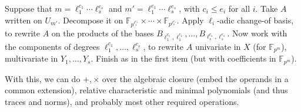 \documentclass{sig-alternate}
\def\F {\ensuremath{\mathbb{F}}}
\begin{document}
\begin{itemize}
  Suppose that $m = \ell_1^{c_1} \cdots \ell_s^{c_s}$ and $m' =
  \ell_1^{e_1} \cdots \ell_s^{e_s}$, with $c_i \le e_i$ for all $i$.
  Take $A$ written on $U_{m'}$. Decompose it on $\F_{p^{\ell_1^{e_1}}}
  \times \cdots \times \F_{p^{\ell_s^{e_s}}}$. Apply $\ell_i$-adic
  change-of basis, to rewrite $A$ on the products of the bases
  $B_{\ell_1^{c_1},\ell_1^{e_1}},\dots,B_{\ell_s^{c_s},\ell_s^{e_s}}$.
  Now work with the components of degrees $\ell_1^{c_1},\dots,\ell_s^{c_s}$,
  to rewrite $A$ univariate in $X$ (for $\F_{p^m}$), multivariate 
  in $Y_1,\dots,Y_s$. Finish as in the first item (but with coefficients in
  $\F_{p^m}$).
\end{itemize}

With this, we can do $+,\times$ over the algebraic closure (embed the
operands in a common extension), relative characteristic and minimal
polynomials (and thus traces and norms), and probably most other
required operations.




 
\end{document}
